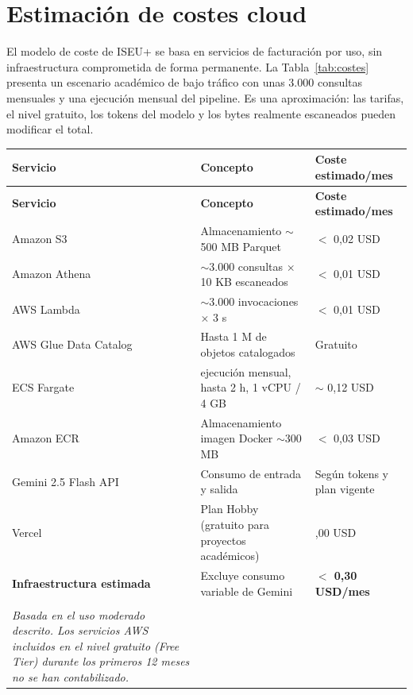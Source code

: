 \section{Estimación de costes cloud}

El modelo de coste de ISEU+ se basa en servicios de facturación por uso, sin infraestructura comprometida de forma permanente. La Tabla~\ref{tab:costes} presenta un escenario académico de bajo tráfico con unas 3.000 consultas mensuales y una ejecución mensual del pipeline. Es una aproximación: las tarifas, el nivel gratuito, los tokens del modelo y los bytes realmente escaneados pueden modificar el total.

\begin{longtable}{>{\raggedright\arraybackslash}p{} >{\raggedright\arraybackslash}p{} >{\raggedright\arraybackslash}p{}}
\toprule
\textbf{Servicio} & \textbf{Concepto} & \textbf{Coste estimado/mes} \\
\midrule
\endfirsthead
\toprule
\textbf{Servicio} & \textbf{Concepto} & \textbf{Coste estimado/mes} \\
\midrule
\endhead
Amazon S3 & Almacenamiento $\sim$500 MB Parquet & $<$ 0,02 USD \\
Amazon Athena & $\sim$3.000 consultas $\times$ 10 KB escaneados & $<$ 0,01 USD \\
AWS Lambda & $\sim$3.000 invocaciones $\times$ 3 s & $<$ 0,01 USD \\
AWS Glue Data Catalog & Hasta 1 M de objetos catalogados & Gratuito \\
ECS Fargate & 1 ejecución mensual, hasta 2 h, 1 vCPU / 4 GB & $\sim$ 0,12 USD \\
Amazon ECR & Almacenamiento imagen Docker $\sim$300 MB & $<$ 0,03 USD \\
Gemini 2.5 Flash API & Consumo de entrada y salida & Según tokens y plan vigente \\
Vercel & Plan Hobby (gratuito para proyectos académicos) & 0,00 USD \\
\midrule
\textbf{Infraestructura estimada} & Excluye consumo variable de Gemini & \textbf{$<$ 0,30 USD/mes} \\
\bottomrule
\caption{\textbf{Estimación de costes mensuales del sistema ISEU+ en producción.}\\
\textit{Basada en el uso moderado descrito. Los servicios AWS incluidos en el nivel gratuito (Free Tier) durante los primeros 12 meses no se han contabilizado.}}
\label{tab:costes}
\end{longtable}

